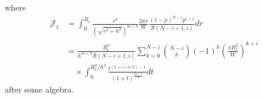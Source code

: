 \documentclass{beamer}
\providecommand{\brak}[1]{\ensuremath{\left(#1\right)}}
\theoremstyle{remark}
\begin{document}
   \begin{frame}
  where
   \begin{align}
    \mathcal{J}_1& = \int_{0}^{R_i}\frac{r^{\alpha}}{\brak{\sqrt{r^2+h^2}}^{m+3}}\frac{2\pi r}{W}\frac{\brak{1-p}^{N-i}p^{i-1}}{\mathcal{B}\brak{N-i+1,i}}dr 
   \nonumber \\
       & = \frac{R_i^{\alpha}}{h^{m+3}\mathcal{B}\brak{N-i+1,i}}\sum_{k=0}^{N-i}\binom{N-i}{k}(-1)^k\brak{\frac{\pi R_i^2}{W}}^{k+i}
       \nonumber \\
       & \quad \times \int_{0}^{R_i^2/h^2}\frac{t^{\brak{k+i+\alpha/2}-1}}{\brak{1+t}^\frac{m+3}{2}}dt
       \label{J_1_app}
   \end{align}
after some algebra.   
\end{frame}
\end{document}
